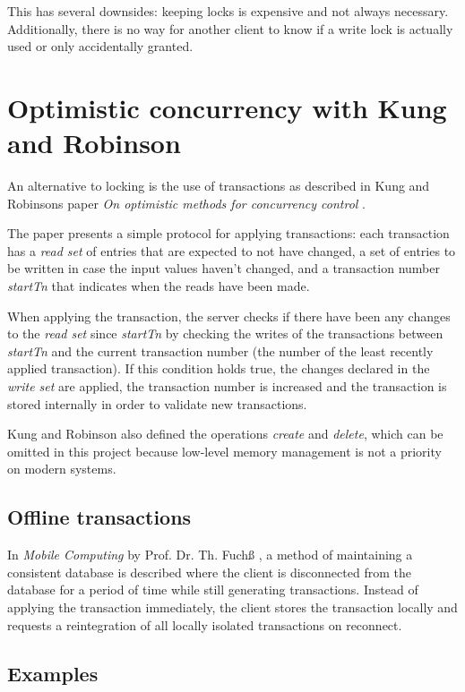 This has several downsides: keeping locks is expensive and not always necessary.
Additionally, there is no way for another client to know if a write lock is
actually used or only accidentally granted.

\section{Optimistic concurrency with Kung and Robinson}

An alternative to locking is the use of transactions as described in Kung and
Robinsons paper \emph{On optimistic methods for concurrency control}
\cite{kung1981}.

The paper presents a simple protocol for applying transactions: each transaction
has a \emph{read set} of entries that are expected to not have changed, a set of
entries to be written in case the input values haven't changed, and a
transaction number \emph{startTn} that indicates when the reads have been made.

When applying the transaction, the server checks if there have been any changes
to the \emph{read set} since \emph{startTn} by checking the writes of the
transactions between \emph{startTn} and the current transaction number (the
number of the least recently applied transaction). If this condition holds true,
the changes declared in the \emph{write set} are applied, the transaction number
is increased and the transaction is stored internally in order to validate new
transactions.

Kung and Robinson also defined the operations \emph{create} and \emph{delete},
which can be omitted in this project because low-level memory management is not
a priority on modern systems.

\subsection{Offline transactions}

In \emph{Mobile Computing} by Prof. Dr. Th. Fuchß \cite{fuchss2009}, a method of
maintaining a consistent database is described where the client is disconnected
from the database for a period of time while still generating transactions.
Instead of applying the transaction immediately, the client stores the
transaction locally and requests a reintegration of all locally isolated
transactions on reconnect.

\pagebreak
\subsection{Examples}

